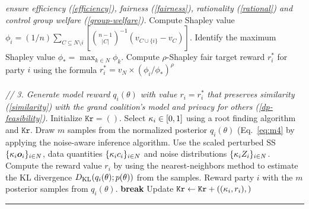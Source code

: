 \documentclass{article}
\makeatletter
\newenvironment{breakablealgorithm}
{
    \begin{raggedright}
        \refstepcounter{algorithm}
        \renewcommand{\caption}[1]
        {
            \addcontentsline{loa}{algorithm}{\protect\numberline{\thealgorithm}##1}
            \parbox{\textwidth}
            {
                \hrule height.8pt depth0pt \kern2pt
                {\raggedright\textbf{\fname@algorithm~\thealgorithm} ##1\par}
                \kern2pt\hrule\kern2pt
            }
        }
}
{
        \kern2pt\hrule\relax
    \end{raggedright}
}
\newcommand{\algorithmicbreak}{\textbf{break}}
\newcommand{\BREAK}{\STATE \algorithmicbreak}
\theoremstyle{plain}
\theoremstyle{definition}
\theoremstyle{remark}
\makeatother
\begin{document}
\begin{breakablealgorithm}
\begin{algorithmic}[1]
        \textcolor{overviewblue}{\textit{ ensure efficiency (\ref{efficiency}), fairness (\ref{fairness}), rationality (\ref{rational}) and control group welfare (\ref{group-welfare}).}}
        \STATE Compute Shapley value $\phi_i = \textstyle \left({1}/{n}\right)
\sum_{C \subseteq N \setminus i} 
\left[ {{n-1} \choose |C|}^{-1} 
\left( v_{C \cup \{i\}} - v_C \right) \right] $.
        \ENDFOR
        \STATE Identify the maximum Shapley value $\phi_* = \max_{k \in N} \phi_k$.
        \STATE Compute $\rho$-Shapley fair target reward $r_i^*$ for party $i$ using the formula $ r_i^* = v_N \times (\phi_i/\phi_*)^\rho $
        \ENDFOR \\ \label{algstep:decide-end}
        \textit{ \\ // 3. Generate model reward $q_i(\theta)$ with value $r_i = r_i^*$}
        \textcolor{overviewblue}{\textit{ that preserves similarity (\ref{similarity}) with the grand coalition's model and privacy for others (\ref{dp-feasibility}).}}
        \STATE Initialize $\texttt{Kr} = ()$. \label{algstep:reward-start}
            \STATE Select ${\kappa_i} \in [0,1]$ using a root finding algorithm and $\texttt{Kr}$.
            \STATE Draw $m$ samples from the normalized posterior $q_i(\theta)$ (Eq.~\ref{eq:m4} by applying the noise-aware inference algorithm. Use the scaled perturbed SS $\{{\kappa_i} {\bm{o}}_i\}_{i \in N}$, data quantities $\{{\kappa_i} c_i\}_{i \in N}$ and noise distributions $\{{\kappa_i} Z_i\}_{i \in N}$.
            \STATE Compute the reward value $r_i$ by using the nearest-neighbors method \cite{perez2008kl} to estimate the KL divergence $D_{\mathrm{KL}}\hspace{-0.5mm}\left(q_i(\theta); p(\theta)\right)$ from the samples.
                \STATE Reward party $i$ with the $m$ posterior samples from $q_i(\theta)$.
                \BREAK
            \ENDIF
            \STATE Update $\texttt{Kr} \gets \texttt{Kr} + (({\kappa_i}, r_i ),)$
        \ENDWHILE \label{algstep:reward-end}
        \ENDFOR
	\end{algorithmic}
	\label{algo:overview}
\end{breakablealgorithm}
\end{document}
